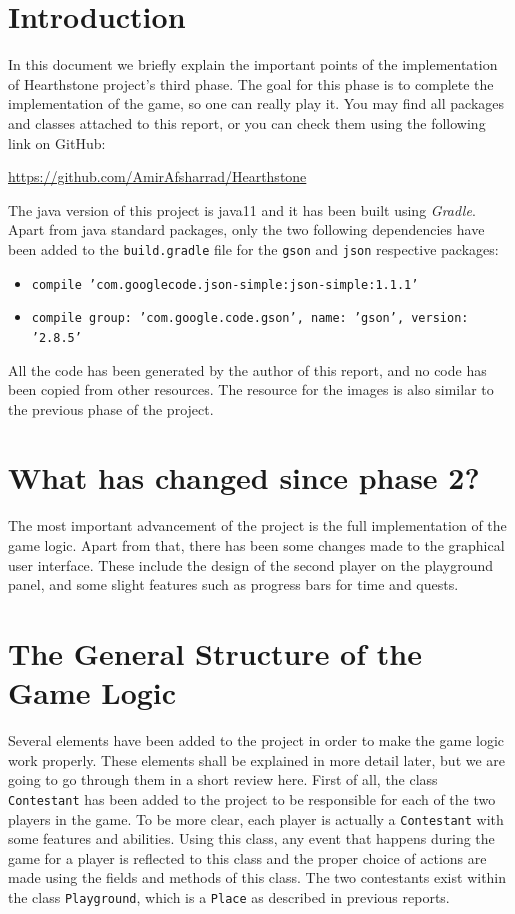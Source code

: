 \documentclass[a4paper]{article}
\begin{document}
\large
\tableofcontents
\clearpage
\section{Introduction}
In this document we briefly explain the important points of the implementation of Hearthstone project's third phase. The goal for this phase is to complete the implementation of the game, so one can really play it. You may find all packages and classes attached to this report, or you can check them using the following link on GitHub:
\begin{center}
	\url{https://github.com/AmirAfsharrad/Hearthstone}
\end{center}
The java version of this project is java11 and it has been built using \textit{Gradle}. Apart from java standard packages, only the two following dependencies have been added to the \texttt{build.gradle} file for the \texttt{gson} and \texttt{json} respective packages:
\begin{itemize}
	\item \texttt{compile 'com.googlecode.json-simple:json-simple:1.1.1'}
	\item \texttt{compile group: 'com.google.code.gson', name: 'gson', version: '2.8.5'}
\end{itemize}
All the code has been generated by the author of this report, and no code has been copied from other resources. The resource for the images is also similar to the previous phase of the project.

\clearpage
\section{What has changed since phase 2?}
The most important advancement of the project is the full implementation of the game logic. Apart from that, there has been some changes made to the graphical user interface. These include the design of the second player on the playground panel, and some slight features such as progress bars for time and quests.

\clearpage
\section{The General Structure of the Game Logic}
Several elements have been added to the project in order to make the game logic work properly. These elements shall be explained in more detail later, but we are going to go through them in a short review here. First of all, the class \texttt{Contestant} has been added to the project to be responsible for each of the two players in the game. To be more clear, each player is actually a \texttt{Contestant} with some features and abilities. Using this class, any event that happens during the game for a player is reflected to this class and the proper choice of actions are made using the fields and methods of this class. The two contestants exist within the class \texttt{Playground}, which is a \texttt{Place} as described in previous reports.
\end{document}
